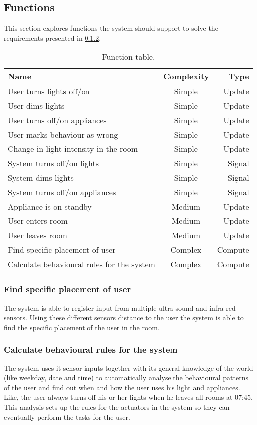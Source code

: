 \subsection{Functions}

This section explores functions the system should support to solve the requirements presented in \cref{}.

\label{subsec:Functions}
\begin{table}[hbtp]
\centering
\begin{tabular}{lcr}
\toprule
\textbf{Name}																& \textbf{Complexity}	& \textbf{Type} \\
\midrule
User turns lights off/on				& Simple	& Update  \\
User dims lights					& Simple	& Update  \\
User turns off/on appliances			& Simple	& Update  \\
User marks behaviour as wrong			& Simple	& Update  \\
Change in light intensity in the room		& Simple	& Update  \\
System turns off/on lights			& Simple	& Signal  \\
System dims lights				& Simple	& Signal  \\
System turns off/on appliances			& Simple	& Signal  \\
Appliance is on standby				& Medium	& Update  \\
User enters room				& Medium	& Update  \\
User leaves room				& Medium	& Update  \\
Find specific placement of user			& Complex	& Compute \\
Calculate behavioural rules for the system	& Complex	& Compute \\
\bottomrule
\end{tabular}
\caption{Function table.}
\label{table:functionlist}
\end{table}

\subsubsection{Find specific placement of user}
The system is able to register input from multiple ultra sound and infra red sensors. Using these different sensors distance to the user the system is able to find the specific placement of the user in the room.

\subsubsection{Calculate behavioural rules for the system}
The system uses it sensor inputs together with its general knowledge of the world (like weekday, date and time) to automatically analyse the behavioural patterns of the user and find out when and how the user uses his light and appliances. Like, the user always turns off his or her lights when he leaves all rooms at 07:45. This analysis sets up the rules for the actuators in the system so they can eventually perform the tasks for the user.
